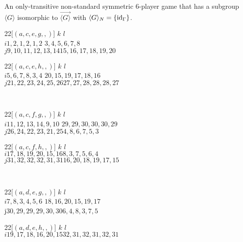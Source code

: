 \begin{example} \label{sixplayereg} 
An only-transitive non-standard symmetric $6$-player game that has a subgroup $\langle{G}\rangle$ isomorphic to $\overrightarrow{\langle{G}\rangle}$ with $\langle{G}\rangle_N = \{\text{id}_{\Gamma}\}$.
  
\begin{center}
\begin{game}{2}{2}[$(a,c,e,g,,)$]
	\>$k$                 \>$l$  \\
	$i$\>$1,2,1,2,1,2$     \>$3,4,5,6,7,8$\\
	$j$\>$9,10,11,12,13,14$\>$15,16,17,18,19,20$  
\end{game}
\hspace*{5mm}
\begin{game}{2}{2}[$(a,c,e,h,,)$]
	\>$k$                  \>$l$ \\
	$i$\>$5,6,7,8,3,4$      \>$20,15,19,17,18,16$\\
	$j$\>$21,22,23,24,25,26$\>$27,27,28,28,28,27$  
\end{game}
\\
\begin{game}{2}{2}[$(a,c,f,g,,)$]
	\>$k$                  \>$l$ \\
	$i$\>$11,12,13,14,9,10$ \>$29,29,30,30,30,29$\\
	$j$\>$26,24,22,23,21,25$\>$4,8,6,7,5,3$        
\end{game}
\hspace*{5mm}
\begin{game}{2}{2}[$(a,c,f,h,,)$]
	\>$k$                  \>$l$ \\
	$i$\>$17,18,19,20,15,16$\>$8,3,7,5,6,4$\\
	$j$\>$31,32,32,32,31,31$\>$16,20,18,19,17,15$  
\end{game}
\\
\begin{game}{2}{2}[$(a,d,e,g,,)$]
	\>$k$                  \>$l$   \\
	$i$\>$7,8,3,4,5,6$      \>$18,16,20,15,19,17$\\
	j\>$30,29,29,29,30,30$\>$6,4,8,3,7,5$        
\end{game}
\hspace*{5mm}
\begin{game}{2}{2}[$(a,d,e,h,,)$]
	\>$k$                  \>$l$  \\
	$i$\>$19,17,18,16,20,15$\>$32,31,32,31,32,31$\\

\end{game}
\end{center}
\end{example}
